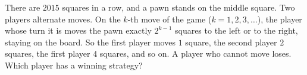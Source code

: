 There are $2015$ squares in a row, and a pawn stands on the middle square. Two players alternate moves. On the $k$-th move of the game ($k=1,2,3,\dots$), the player whose turn it is moves the pawn exactly $2^{k-1}$ squares to the left or to the right, staying on the board. So the first player moves $1$ square, the second player $2$ squares, the first player $4$ squares, and so on. A player who cannot move loses. Which player has a winning strategy?
